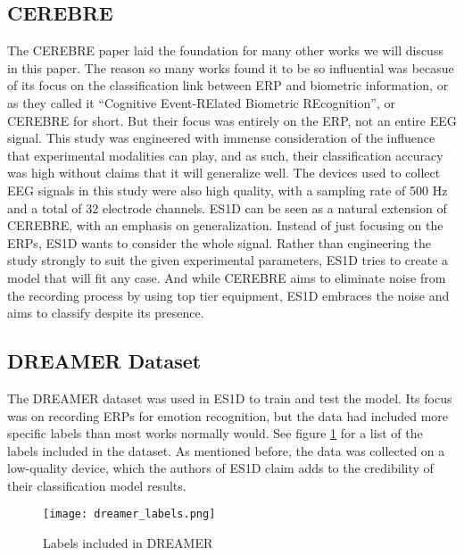 \subsection{CEREBRE}
The CEREBRE paper\cite{Cerebre} laid the foundation for many other works we will discuss in this paper.
The reason so many works found it to be so influential was becasue of its focus on the classification link between ERP and biometric information, or as they called it ``Cognitive Event-RElated
Biometric REcognition'', or CEREBRE for short. But their focus was entirely on the ERP, not an entire EEG signal.
This study was engineered with immense consideration of the influence that experimental modalities can play, and as such, their classification accuracy was high without claims that it will generalize well.
The devices used to collect EEG signals in this study were also high quality, with a sampling rate of 500 Hz and a total of 32 electrode channels.
ES1D can be seen as a natural extension of CEREBRE, with an emphasis on generalization. Instead of just focusing on the ERPs, ES1D wants to consider the whole signal.
Rather than engineering the study strongly to suit the given experimental parameters, ES1D tries to create a model that will fit any case.
And while CEREBRE aims to eliminate noise from the recording process by using top tier equipment, ES1D embraces the noise and aims to classify despite its presence.
\subsection{DREAMER Dataset}
The DREAMER dataset\cite{DREAMER} was used in ES1D to train and test the model. 
Its focus was on recording ERPs for emotion recognition, but the data had included more specific labels than most works normally would.
See figure \ref{fig:dreamer} for a list of the labels included in the dataset. 
As mentioned before, the data was collected on a low-quality device, which the authors of ES1D claim adds to the credibility of their classification model results.
\begin{center}
    \begin{figure}[h]
        \texttt{[image: dreamer\_labels.png]}
        \caption{\small{Labels included in DREAMER}}
        \label{fig:dreamer}
    \end{figure}
\end{center}

